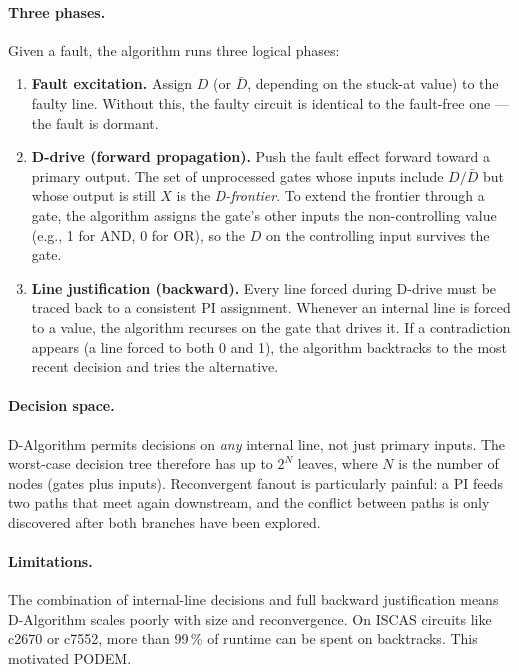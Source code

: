 \documentclass[11pt,a4paper]{article}
\newcommand{\bd}[1]{\textbf{#1}}
\begin{document}
\paragraph{Three phases.} Given a fault, the algorithm runs three
logical phases:
\begin{enumerate}[leftmargin=*,itemsep=2pt]
  \item \bd{Fault excitation.} Assign $D$ (or $\bar D$, depending on
        the stuck-at value) to the faulty line. Without this, the
        faulty circuit is identical to the fault-free one --- the
        fault is dormant.
  \item \bd{D-drive (forward propagation).} Push the fault effect
        forward toward a primary output. The set of unprocessed gates
        whose inputs include $D/\bar D$ but whose output is still $X$
        is the \emph{D-frontier}. To extend the frontier through a
        gate, the algorithm assigns the gate's other inputs the
        non-controlling value (e.g., 1 for AND, 0 for OR), so the
        $D$ on the controlling input survives the gate.
  \item \bd{Line justification (backward).} Every line forced during
        D-drive must be traced back to a consistent PI assignment.
        Whenever an internal line is forced to a value, the algorithm
        recurses on the gate that drives it. If a contradiction
        appears (a line forced to both 0 and 1), the algorithm
        backtracks to the most recent decision and tries the
        alternative.
\end{enumerate}

\paragraph{Decision space.} D-Algorithm permits decisions on
\emph{any} internal line, not just primary inputs. The worst-case
decision tree therefore has up to $2^{N}$ leaves, where $N$ is the
number of nodes (gates plus inputs). Reconvergent fanout is
particularly painful: a PI feeds two paths that meet again
downstream, and the conflict between paths is only discovered after
both branches have been explored.

\paragraph{Limitations.} The combination of internal-line decisions
and full backward justification means D-Algorithm scales poorly with
size and reconvergence. On ISCAS circuits like c2670 or c7552, more
than 99\,\% of runtime can be spent on backtracks. This motivated
PODEM.
\end{document}

